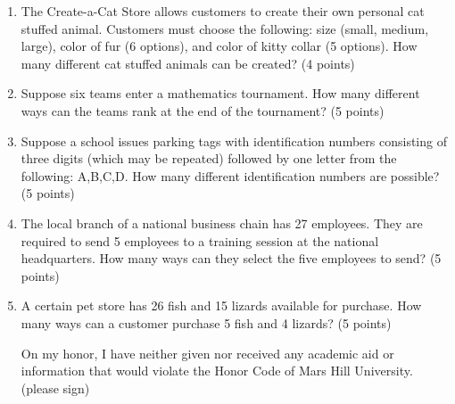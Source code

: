 \documentclass[12pt]{article}
\begin{document}
\begin{enumerate}
\item The Create-a-Cat Store allows customers to create their own personal cat stuffed animal.  Customers must choose the following: size (small, medium, large), color of fur (6 options), and color of kitty collar (5 options).  How many different cat stuffed animals can be created? (4 points)
\vspace{2.0 in}

\item Suppose six teams enter a mathematics tournament.  How many different ways can the teams rank at the end of the tournament?  (5 points)
\vspace{1.4 in}

\item Suppose a school issues parking tags with identification numbers consisting of three digits (which may be repeated) followed by one letter from the following: A,B,C,D.  How many different identification numbers are possible? (5 points)
\vspace{1.4 in}

\item The local branch of a national business chain has 27 employees.  They are required to send 5 employees to a training session at the national headquarters.  How many ways can they select the five employees to send?  (5 points)
\vspace{1.4 in}

\item A certain pet store has 26 fish and 15 lizards available for purchase.  How many ways can a customer purchase 5 fish and 4 lizards? (5 points)
\vspace{1.4 in}

On my honor, I have neither given nor received any academic aid or information that would violate the Honor Code of Mars Hill University. \underline{\hspace{2.0 in}}(please sign)
\end{enumerate}
\end{document}
